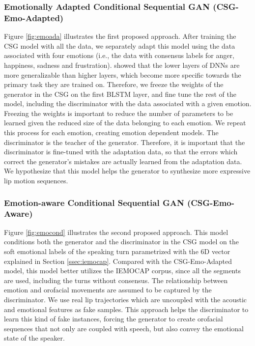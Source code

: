 \documentclass[10pt,journal,compsoc]{IEEEtran}
\begin{document}
\subsubsection{Emotionally Adapted Conditional Sequential GAN (CSG-Emo-Adapted)}
\label{sssec:CSG-Emo-Adapted}
Figure \ref{fig:emoada} illustrates the first proposed approach. After training the CSG model with all the data, we separately adapt this model using the data associated with four emotions (i.e., the data with consensus labels for anger, happiness, sadness and frustration). \citet{Yosinski_2014} showed that the lower layers of DNNs are more generalizable than higher layers, which become more specific towards the primary task they are trained on. Therefore, we freeze the weights of the generator in the CSG on the first BLSTM layer, and fine tune the rest of the model, including the discriminator with the data associated with a given emotion. Freezing the weights is important to reduce the number of parameters to be learned given the reduced size of the data belonging to each emotion. We repeat this process for each emotion, creating emotion dependent models. The discriminator is the teacher of the generator. Therefore, it is important that the discriminator is fine-tuned with the adaptation data, so that the errors which correct the generator's mistakes are actually learned from the adaptation data. We hypothesize that this model helps the generator to synthesize more expressive lip motion sequences.

\subsubsection{Emotion-aware Conditional Sequential GAN (CSG-Emo-Aware)}
\label{sssec:CSG-Emo-Aware} 
Figure \ref{fig:emocond} illustrates the second proposed approach. This model conditions both the generator and the discriminator in the CSG model on the soft emotional labels of the speaking turn parametrized with the 6D vector explained in Section \ref{ssec:iemocap}. 
Compared with the CSG-Emo-Adapted model, this model better utilizes the IEMOCAP corpus, since all the segments are used, including the turns without consensus. The relationship between emotion and orofacial movements are assumed to be captured by the discriminator. We use real lip trajectories which are uncoupled with the acoustic and emotional features as fake samples. This approach helps the discriminator to learn this kind of fake instances, forcing the generator to create orofacial sequences that not only are coupled with speech, but also convey the emotional state of the speaker.
\end{document}
